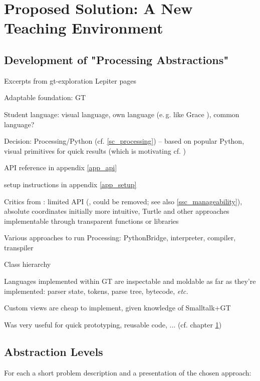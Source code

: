 
\chapter{Proposed Solution: A New Teaching Environment} \label{ch_pa}

\section{Development of "Processing Abstractions"}
Excerpts from gt-exploration Lepiter pages

\begin{todo}
\item Adaptable foundation: GT
\item Student language: visual language, own language (e.\,g. like Grace \cite{Bla18}), common language?
\item Decision: Processing/Python (cf. \ref{sc_processing}) -- based on popular Python, visual primitives for quick results (which is motivating cf. \cite{Chi23})
\item API reference in appendix \ref{app_api}
\item setup instructions in appendix \ref{app_setup}
\item Critics from \cite{Chi23}: limited API (,  could be removed; see also \ref{ssc_manageability}), absolute coordinates initially more intuitive, Turtle and other approaches implementable through transparent functions or libraries
\item Various approaches to run Processing: PythonBridge, interpreter, compiler, transpiler
\item Class hierarchy
\end{todo}

\begin{todo}
\item Languages implemented within GT are inspectable and moldable as far as they're implemented: parser state, tokens, parse tree, bytecode, \emph{etc.}
\item Custom views are cheap to implement, given knowledge of Smalltalk+GT
\item Was very useful for quick prototyping, reusable code, ... (cf. chapter \ref{ch_pa})
\end{todo}


\section{Abstraction Levels}
For each a short problem description and a presentation of the chosen approach:

